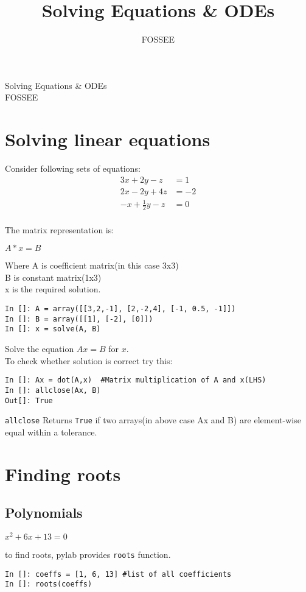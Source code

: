 \documentclass[12pt]{article}
\title{Solving Equations \& ODEs}
\author{FOSSEE}
\newcommand{\typ}[1]{\lstinline{#1}}
\begin{document}
\date{}
\vspace{-1in}
\begin{center}
\LARGE{Solving Equations \& ODEs}\\
\large{FOSSEE}
\end{center}
\section{Solving linear equations}
Consider following sets of equations:\\
  \begin{align*}
    3x + 2y - z  & = 1 \\
    2x - 2y + 4z  & = -2 \\
    -x + \frac{1}{2}y -z & = 0
  \end{align*}\\
The matrix representation is:\\
\begin{center}
$A*x = B$
\end{center}
Where A is coefficient matrix(in this case 3x3)\\
B is constant matrix(1x3)\\
x is the required solution.\\
\begin{lstlisting}
In []: A = array([[3,2,-1], [2,-2,4], [-1, 0.5, -1]])
In []: B = array([[1], [-2], [0]])
In []: x = solve(A, B)
\end{lstlisting}
Solve the equation $A x = B$ for $x$.\\
To check whether solution is correct try this:
\begin{lstlisting}
In []: Ax = dot(A,x)  #Matrix multiplication of A and x(LHS)
In []: allclose(Ax, B)
Out[]: True
\end{lstlisting}
\typ{allclose} Returns \typ{True} if two arrays(in above case Ax and B) are element-wise equal within a tolerance. 
\newpage
\section{Finding roots}
\subsection{Polynomials}
\begin{center}
  $x^2+6x+13=0$
\end{center}
to find roots, pylab provides \typ{roots} function.
\begin{lstlisting}
In []: coeffs = [1, 6, 13] #list of all coefficients
In []: roots(coeffs)
\end{lstlisting}
\end{document}
